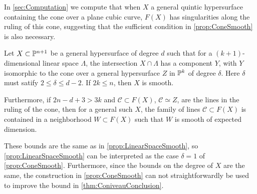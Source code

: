 In \cref{sec:Computation} we compute that when $X$ a general quintic hypersurface containing the cone over a plane cubic curve, $F(X)$ has singularities along the ruling of this cone, suggesting that the sufficient condition in \cref{prop:ConeSmooth} is also necessary.

\begin{proposition}
	\label{prop:ConeSmooth}
	Let $X \subset \P^{n+1}$ be a general hypersurface of degree $d$ such that for a $(k+1)$-dimensional linear space $\Lambda$, the intersection $X \cap \Lambda$ has a component $Y$, with $Y$ isomorphic to the cone over a general hypersurface $Z$ in $\P^k$ of degree $\delta$. Here $\delta$ must satify $2 \leq \delta \leq d-2$. If $2k \leq n$, then $X$ is smooth.
	
	Furthermore, if $2n-d+3 > 3k$ and $\mathcal{C} \subset F(X)$, $\mathcal{C} \simeq Z$, are the lines in the ruling of the cone, then for a general such $X$, the family of lines $\mathcal{C} \subset F(X)$ is contained in a neighborhood $W \subset F(X)$ such that $W$ is smooth of expected dimension.
\end{proposition}
\begin{remark}
	These bounds are the same as in \cref{prop:LinearSpaceSmooth}, so \cref{prop:LinearSpaceSmooth} can be interpreted as the case $\delta = 1$ of \cref{prop:ConeSmooth}. Furthermore, since the bounds on the degree of $X$ are the same, the construction in \cref{prop:ConeSmooth} can not straightforwardly be used to improve the bound in \cref{thm:ConiveauConclusion}.
\end{remark}
